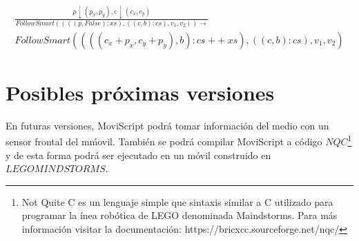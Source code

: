\documentclass[11pt]{scrartcl}
\begin{document}
\begin{equation}
    \begin{split}
\frac{p \downarrow (p_x,p_y) , c \downarrow (c_x,c_y)}{FollowSmart((((p, False):xs), ((c,b):cs), v_1, v_2)) \to } \\
FollowSmart((((c_x + p_x, c_y + p_y), b):cs \mathop{+\!\!+} xs), ((c,b):cs), v_1, v_2)
    \end{split}
\end{equation}

\section{Posibles pr\'oximas versiones}

En futuras versiones, MoviScript podr\'a tomar informaci\'on del medio con un sensor frontal del m\'movil. 
Tambi\'en se podr\'a compilar MoviScript a c\'odigo 
$NQC$\footnote{Not Quite C es un lenguaje simple que sintaxis similar a C utilizado para programar 
la \'inea rob\'otica de LEGO denominada Maindstorms. Para m\'as informaci\'on visitar la 
documentaci\'on: https://bricxcc.sourceforge.net/nqc/}
 y de esta forma podr\'a ser ejecutado en un m\'ovil construido 
 en $LEGO MINDSTORMS$.
\end{document}
